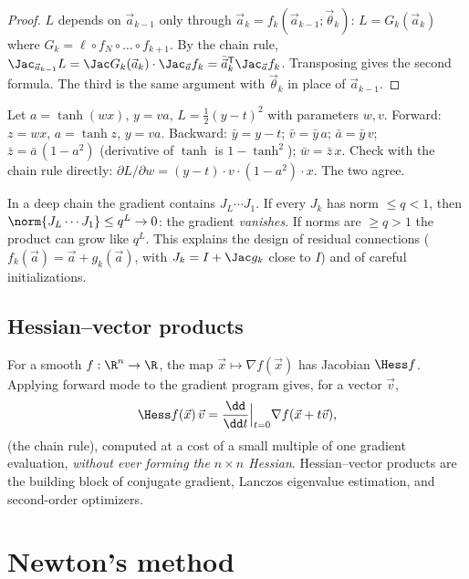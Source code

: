 \begin{proof}
$L$ depends on $\vec a_{k-1}$ only through $\vec a_k=f_k(\vec a_{k-1};\vec\theta_k)$: $L=G_k(\vec a_k)$ where $G_k=\ell\circ f_N\circ\dots\circ f_{k+1}$. By the chain rule, $\Jac_{\vec a_{k-1}}L=\Jac G_k(\vec a_k)\cdot\Jac_{\vec a}f_k=\bar{\vec a}_k^{\mathsf T}\Jac_{\vec a}f_k$. Transposing gives the second formula. The third is the same argument with $\vec\theta_k$ in place of $\vec a_{k-1}$.
\end{proof}

\begin{example}
Let $a=\tanh(wx)$, $y=va$, $L=\frac12(y-t)^2$ with parameters $w,v$. Forward: $z=wx$, $a=\tanh z$, $y=va$. Backward: $\bar y=y-t$; $\bar v=\bar y\,a$; $\bar a=\bar y\,v$; $\bar z=\bar a\,(1-a^2)$ (derivative of $\tanh$ is $1-\tanh^2$); $\bar w=\bar z\,x$. Check with the chain rule directly: $\partial L/\partial w=(y-t)\cdot v\cdot(1-a^2)\cdot x$. The two agree.
\end{example}

\begin{example}
In a deep chain the gradient contains $J_L\cdots J_1$. If every $J_k$ has norm $\le q<1$, then $\norm{J_L\cdots J_1}\le q^L\to0$: the gradient \emph{vanishes}. If norms are $\ge q>1$ the product can grow like $q^L$. This explains the design of residual connections ($f_k(\vec a)=\vec a+g_k(\vec a)$, with $J_k=I+\Jac g_k$ close to $I$) and of careful initializations.
\end{example}

\subsection{Hessian--vector products}

For a smooth $f:\R^n\to\R$, the map $\vec x\mapsto\nabla f(\vec x)$ has Jacobian $\Hess f$. Applying forward mode to the gradient program gives, for a vector $\vec v$,
\[
\Hess f(\vec x)\,\vec v=\frac{\dd}{\dd t}\Big|_{t=0}\nabla f(\vec x+t\vec v),
\]
(the chain rule), computed at a cost of a small multiple of one gradient evaluation, \emph{without ever forming the $n\times n$ Hessian}. Hessian--vector products are the building block of conjugate gradient, Lanczos eigenvalue estimation, and second-order optimizers.

\section{Newton's method}
\label{sec:newton}

